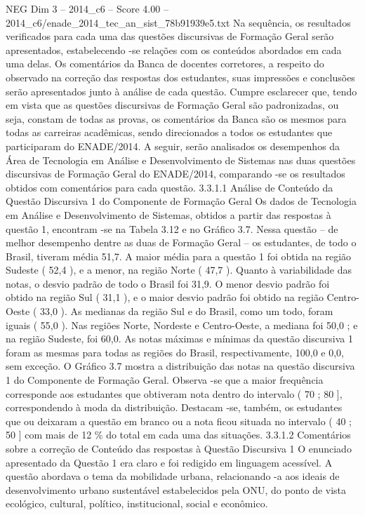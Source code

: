 \begin{textsample}{NEG Dim 3 – 2014\_c6 – Score 4.00 – 2014\_c6/enade\_2014\_tec\_an\_sist\_78b91939e5.txt}
Na sequência, os resultados verificados para cada uma das questões discursivas de Formação Geral serão apresentados, estabelecendo -se relações com os conteúdos abordados em cada uma delas.
Os comentários da Banca de docentes corretores, a respeito do observado na correção das respostas dos estudantes, suas impressões e conclusões serão apresentados junto à análise de cada questão.
Cumpre esclarecer que, tendo em vista que as questões discursivas de Formação Geral são padronizadas, ou seja, constam de todas as provas, os comentários da Banca são os mesmos para todas as carreiras acadêmicas, sendo direcionados a todos os estudantes que participaram do ENADE/2014.
A seguir, serão analisados os desempenhos da Área de Tecnologia em Análise e Desenvolvimento de Sistemas nas duas questões discursivas de Formação Geral do ENADE/2014, comparando -se os resultados obtidos com comentários para cada questão. 3.3.1.1 Análise de Conteúdo da Questão Discursiva 1 do Componente de Formação Geral Os dados de Tecnologia em Análise e Desenvolvimento de Sistemas, obtidos a partir das respostas à questão 1, encontram -se na Tabela 3.12 e no Gráfico 3.7.
Nessa questão – de melhor desempenho dentre as duas de Formação Geral – os estudantes, de todo o Brasil, tiveram média 51,7.
A maior média para a questão 1 foi obtida na região Sudeste ( 52,4 ), e a menor, na região Norte ( 47,7 ).
Quanto à variabilidade das notas, o desvio padrão de todo o Brasil foi 31,9.
O menor desvio padrão foi obtido na região Sul ( 31,1 ), e o maior desvio padrão foi obtido na região Centro-Oeste ( 33,0 ).
As medianas da região Sul e do Brasil, como um todo, foram iguais ( 55,0 ).
Nas regiões Norte, Nordeste e Centro-Oeste, a mediana foi 50,0 ; e na região Sudeste, foi 60,0.
As notas máximas e mínimas da questão discursiva 1 foram as mesmas para todas as regiões do Brasil, respectivamente, 100,0 e 0,0, sem exceção.
O Gráfico 3.7 mostra a distribuição das notas na questão discursiva 1 do Componente de Formação Geral.
Observa -se que a maior frequência corresponde aos estudantes que obtiveram nota dentro do intervalo ( 70 ; 80 ], correspondendo à moda da distribuição.
Destacam -se, também, os estudantes que ou deixaram a questão em branco ou a nota ficou situada no intervalo ( 40 ; 50 ] com mais de 12 \% do total em cada uma das situações. 3.3.1.2 Comentários sobre a correção de Conteúdo das respostas à Questão Discursiva 1 O enunciado apresentado da Questão 1 era claro e foi redigido em linguagem acessível.
A questão abordava o tema da mobilidade urbana, relacionando -a aos ideais de desenvolvimento urbano sustentável estabelecidos pela ONU, do ponto de vista ecológico, cultural, político, institucional, social e econômico.

\end{textsample}

